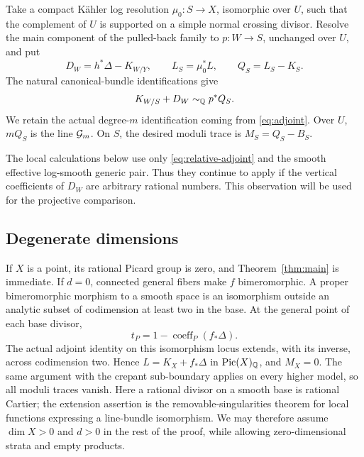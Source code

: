 Take a compact K\"ahler log resolution
\(\mu_0:S\to X\), isomorphic over \(U\), such that the complement of
\(U\) is supported on a simple normal crossing divisor.
Resolve the main component of the pulled-back family to
\(p:W\to S\), unchanged over \(U\), and put
\begin{equation}\label{eq:prepared-data}
 D_W=h^*\Delta-K_{W/Y},\qquad
 L_S=\mu_0^*L,\qquad Q_S=L_S-K_S .
\end{equation}
The natural canonical-bundle identifications give
\begin{equation}\label{eq:relative-adjoint}
 K_{W/S}+D_W\sim_{\mathbb Q}p^*Q_S .
\end{equation}
We retain the actual degree-\(m\) identification coming from
\eqref{eq:adjoint}. Over \(U\), \(mQ_S\) is the line \(\mathcal G_m\).
On \(S\), the desired moduli trace is \(M_S=Q_S-B_S\).

The local calculations below use only \eqref{eq:relative-adjoint}
and the smooth effective log-smooth generic pair.
Thus they continue to apply if the vertical coefficients of
\(D_W\) are arbitrary rational numbers.
This observation will be used for the projective comparison.

\subsection{Degenerate dimensions}

If \(X\) is a point, its rational Picard group is zero, and
Theorem~\ref{thm:main} is immediate.
If \(d=0\), connected general fibers make \(f\) bimeromorphic.
A proper bimeromorphic morphism to a smooth space is an isomorphism
outside an analytic subset of codimension at least two in the base.
At the general point of each base divisor,
\[
 t_P=1-\operatorname{coeff}_P(f_*\Delta).
\]
The actual adjoint identity on this isomorphism locus extends, with
its inverse, across codimension two. Hence
\(L=K_X+f_*\Delta\) in \(\operatorname{Pic}(X)_{\mathbb Q}\), and \(M_X=0\).
The same argument with the crepant sub-boundary applies on every
higher model, so all moduli traces vanish.
Here a rational divisor on a smooth base is rational Cartier;
the extension assertion is the removable-singularities theorem for
local functions expressing a line-bundle isomorphism.
We may therefore assume \(\dim X>0\) and \(d>0\) in the rest of the
proof, while allowing zero-dimensional strata and empty products.

